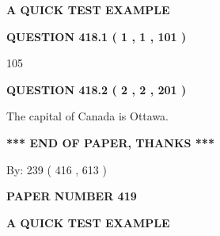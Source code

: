 \documentclass[12pt]{article}
\begin{document}
   
   
   
 \vspace{0.2in}
{\LARGE {\textbf{ A QUICK TEST EXAMPLE}}}
   
   
  
\vspace{0.2in}
  
{\textbf{\Large{QUESTION
418.1 
 ( 1 , 1 , 101 )
}}}
  
  
 
 
\noindent{}

105
 
 
  
\vspace{0.2in}
  
{\textbf{\Large{QUESTION
418.2 
 ( 2 , 2 , 201 )
}}}
  
  
 
 
\noindent{}
 
 
The capital of Canada is Ottawa.
 
 
 
 
   
   
 \vspace{0.2in}
 
   
   
   
   
\vspace{1.0in} 
{\textbf{\large{ *** END OF PAPER, THANKS *** }}} 
   
   
\hspace{1.0in} By: 
 239 ( 416 ,  613 )
   
   
   
   
\newpage 
\setcounter{page}{ 
   419001 } 
   
   
   
   
 {\textbf{ \Large{ PAPER NUMBER  419  }}}
   
   
\vspace{0.2in}
   
   
   
   
   
   
 \vspace{0.2in}
{\LARGE {\textbf{ A QUICK TEST EXAMPLE}}}
   
   
  
\vspace{0.2in}
  
\end{document}
